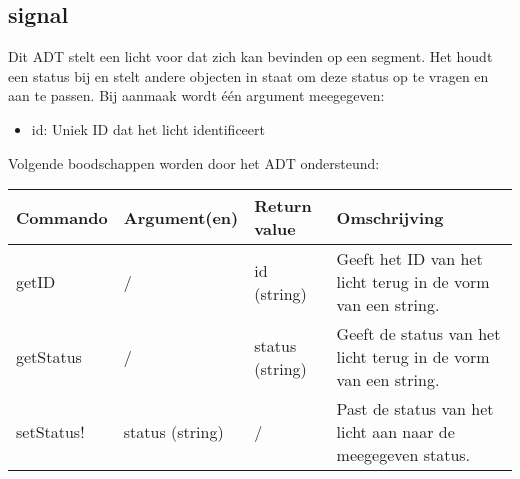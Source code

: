 \documentclass{article}
\begin{document}
\subsection{signal} %
Dit ADT stelt een licht voor dat zich kan bevinden op een segment. Het houdt een status bij en stelt andere objecten in staat om deze status op te vragen en aan te passen. Bij aanmaak wordt \'{e}\'{e}n argument meegegeven:
\begin{itemize}
  \item id: Uniek ID dat het licht identificeert
\end{itemize}
Volgende boodschappen worden door het ADT ondersteund:
\begin{center}
    \begin{tabular}{ | l | l | l | p{8cm} |}
    \hline
    Commando & Argument(en) & Return value & Omschrijving \\ \hline
    getID & / & id (string) & Geeft het ID van het licht terug in de vorm van een string. \\ \hline
    getStatus & / & status (string) & Geeft de status van het licht terug in de vorm van een string. \\ \hline
    setStatus! & status (string) & / & Past de status van het licht aan naar de meegegeven status. \\ \hline
    \end{tabular}
\end{center}
\end{document}
